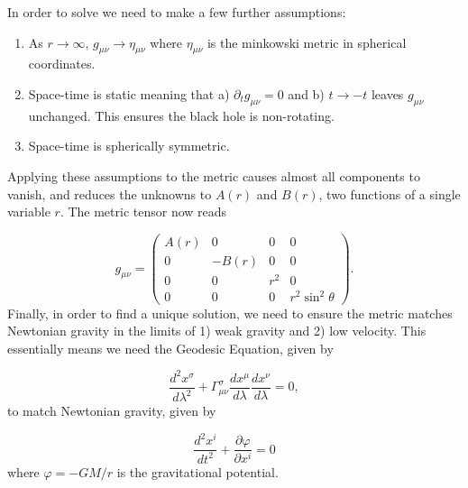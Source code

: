 \documentclass{CUP-JNL-DTM}%
\theoremstyle{definition}
\numberwithin{equation}{section}
\begin{document}
In order to solve we need to make a few further assumptions:

\begin{enumerate}
    \item As $r \rightarrow \infty$, $g_{\mu\nu} \rightarrow \eta_{\mu\nu}$ where $\eta_{\mu\nu}$ is the minkowski metric in spherical coordinates. 
    \item Space-time is static meaning that a) $\partial_t g_{\mu\nu} = 0$ and b) $t \rightarrow -t$ leaves $g_{\mu\nu}$ unchanged. This ensures the black hole is non-rotating. 
    \item Space-time is spherically symmetric. 
\end{enumerate}
Applying these assumptions to the metric causes almost all components to vanish, and reduces the unknowns to $A(r)$ and $B(r)$, two functions of a single variable $r$. The metric tensor now reads 

\begin{equation}
    g_{\mu\nu} = \begin{pmatrix}
        A(r) & 0 & 0 & 0 \\
        0 & -B(r) & 0 & 0 \\
        0 & 0 & r^2 & 0 \\
        0 & 0 & 0 & r^2\sin^2\theta
    \end{pmatrix}.
    \label{eqn:g_simple}
\end{equation}
Finally, in order to find a unique solution, we need to ensure the metric matches Newtonian gravity in the limits of 1) weak gravity and 2) low velocity. This essentially means we need the Geodesic Equation, given by 

\begin{equation}
    \frac{d^2 x^{\sigma}}{d\lambda^2} + \Gamma^{\sigma}_{\mu\nu} \frac{dx^{\mu}}{d\lambda}\frac{dx^{\nu}}{d\lambda} = 0,
    \label{eqn:geo}
\end{equation}
to match Newtonian gravity, given by 

\begin{equation}
    \frac{d^2x^i}{dt^2} + \frac{\partial\varphi}{\partial x^i} = 0
    \label{eqn:newton}
\end{equation}
where $\varphi = -GM/r$ is the gravitational potential. 
\end{document}
